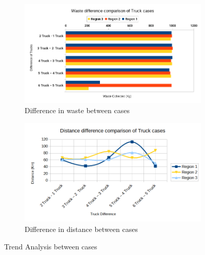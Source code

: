 \documentclass[12pt]{article}
\begin{document}
\begin{figure}[H]
    \centering
    \begin{subfigure}{0.5\textwidth}
        \centering
        \includegraphics[width=\linewidth]{Waste Difference Between Trucks.png}
        \caption{Difference in waste between cases}\label{figd1}
    \end{subfigure}%
    \begin{subfigure}{0.5\textwidth}
        \centering
        \includegraphics[width=\linewidth]{Distance Difference Between Trucks Scatterplot.png}
        \caption{Difference in distance between cases}\label{figd2}
    \end{subfigure}
    \caption{Trend Analysis between cases}
    \label{figd}
\end{figure}
\end{document}
